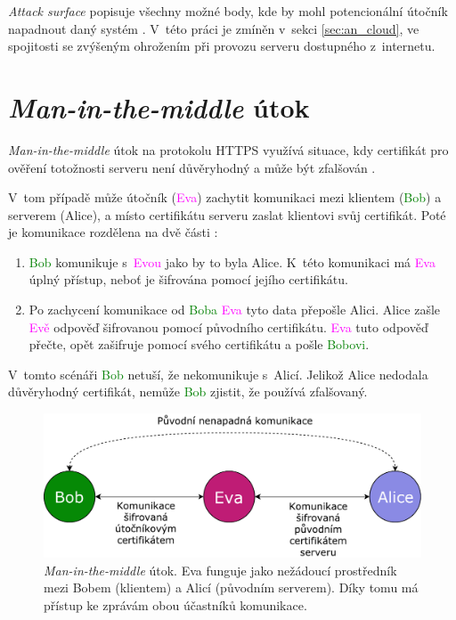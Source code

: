 \textit{Attack surface} popisuje všechny možné body, kde by mohl potencionální útočník napadnout daný systém \cite{attack_surface_owasp}. V~této práci je zmíněn v~sekci \ref{sec:an_cloud}, ve spojitosti se zvýšeným ohrožením při provozu serveru dostupného z~internetu.

\section{\textit{Man-in-the-middle} útok}

\textit{Man-in-the-middle} útok na protokolu HTTPS využívá situace, kdy certifikát pro ověření totožnosti serveru není důvěryhodný a může být zfalšován \cite{mitm}. 

V~tom případě může útočník (\textcolor{magenta}{Eva}) zachytit komunikaci mezi klientem (\textcolor{green}{Bob}) a serverem (\textcolor{blue2}{Alice}), a místo certifikátu serveru zaslat klientovi svůj certifikát. Poté je komunikace rozdělena na dvě části \cite{mitm}:

\begin{enumerate}
    \item \textcolor{green}{Bob} komunikuje s~\textcolor{magenta}{Evou} jako by to byla \textcolor{blue2}{Alice}. K~této komunikaci má \textcolor{magenta}{Eva} úplný přístup, neboť je šifrována pomocí jejího certifikátu.
    \item Po zachycení komunikace od \textcolor{green}{Boba} \textcolor{magenta}{Eva} tyto data přepošle \textcolor{blue2}{Alici}. \textcolor{blue2}{Alice} zašle \textcolor{magenta}{Evě} odpověď šifrovanou pomocí původního certifikátu. \textcolor{magenta}{Eva} tuto odpověď přečte, opět zašifruje pomocí svého certifikátu a pošle \textcolor{green}{Bobovi}.
\end{enumerate}

V~tomto scénáři \textcolor{green}{Bob} netuší, že nekomunikuje s~\textcolor{blue2}{Alicí}. Jelikož \textcolor{blue2}{Alice} nedodala důvěryhodný certifikát, nemůže \textcolor{green}{Bob} zjistit, že používá zfalšovaný.

\begin{figure}[h!]
    \centering
    \includegraphics[width=\textwidth]{images/mitm.pdf}
    \caption[\textit{Man-in-the-middle} útok]{\textit{Man-in-the-middle} útok. Eva funguje jako nežádoucí prostředník mezi Bobem (klientem) a Alicí (původním serverem). Díky tomu má přístup ke zprávám obou účastníků komunikace. \cite{mitm}}
    \label{fig:mitm}
\end{figure}

